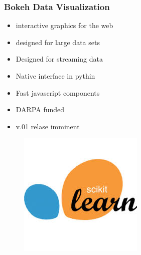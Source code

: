 \documentclass[MASTER.tex]{subfiles}
\begin{document}
\begin{frame}
	\frametitle{Bokeh Data Visualization}
	\begin{itemize}
		\item interactive graphics for the web
		\item designed for large data sets
		\item Designed for streaming data
		\item Native interface in pythin
		\item Fast javascript components
		\item DARPA funded
		\item v.01 relase imminent
	\end{itemize}
	
\end{frame}


\begin{frame}
	\begin{figure}
\centering
\includegraphics[width=0.7\linewidth]{SKL-logo}
\caption{}
\label{fig:SKL-logo}
\end{figure}

\end{frame}
\end{document}
